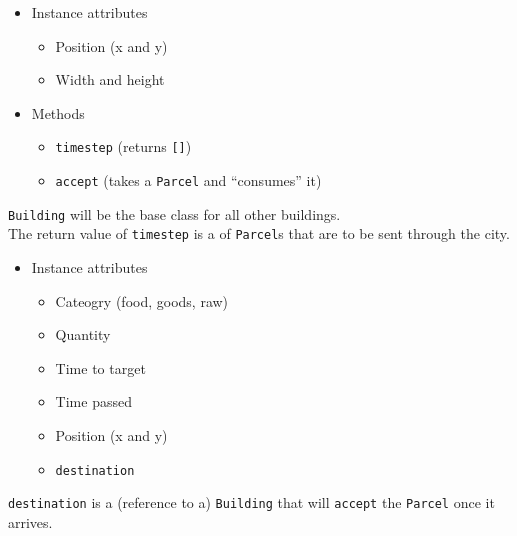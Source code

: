 \begin{frame}[fragile]
%
\begin{tcbraster}[raster columns=2,
                  raster equal height,
                  nobeforeafter,
                  raster column skip=0.5cm]
\begin{tcolorbox}[title=Class \texttt{Building}]
\begin{itemize}
\item Instance attributes
	\begin{itemize}
	\item Position (x and y)
	\item Width and height
	\end{itemize}
\item Methods
	\begin{itemize}
	\item \texttt{timestep} (returns \texttt{[]})
	\item \texttt{accept} (takes a \texttt{Parcel} and \enquote{consumes} it)
	\end{itemize}
\end{itemize}

\texttt{Building} will be the base class for all other buildings.\\
The return value of \texttt{timestep} is a  of \texttt{Parcel}s that are to be sent through the city.
\end{tcolorbox}
%
\begin{tcolorbox}[title=Class \texttt{Parcel}]
\begin{itemize}
\item Instance attributes
	\begin{itemize}
	\item Cateogry (food, goods, raw)
	\item Quantity
	\item Time to target
	\item Time passed
	\item Position (x and y)
	\item \texttt{destination}
	\end{itemize}
\end{itemize}

\texttt{destination} is a (reference to a) \texttt{Building} that will \texttt{accept} the \texttt{Parcel}  once it arrives.
\end{tcolorbox}
\end{tcbraster}
%
\end{frame}


